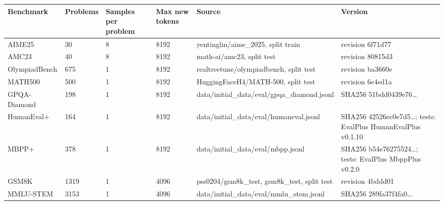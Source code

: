 \begin{tabular}{llllll}
\toprule
Benchmark & Problems & Samples per problem & Max new tokens & Source & Version \\
\midrule
AIME25 & 30 & 8 & 8192 & yentinglin/aime\_2025, split train & revision 6f71d77 \\
AMC23 & 40 & 8 & 8192 & math-ai/amc23, split test & revision 80815d3 \\
OlympiadBench & 675 & 1 & 8192 & realtreetune/olympiadbench, split test & revision ba3660e \\
MATH500 & 500 & 1 & 8192 & HuggingFaceH4/MATH-500, split test & revision 6e4ed1a \\
GPQA-Diamond & 198 & 1 & 8192 & data/initial\_data/eval/gpqa\_diamond.jsonl & SHA256 51bdd0439e76… \\
HumanEval+ & 164 & 1 & 8192 & data/initial\_data/eval/humaneval.jsonl & SHA256 42526ec0e7d5…; tests: EvalPlus HumanEvalPlus v0.1.10 \\
MBPP+ & 378 & 1 & 8192 & data/initial\_data/eval/mbpp.jsonl & SHA256 b54e76275524…; tests: EvalPlus MbppPlus v0.2.0 \\
GSM8K & 1319 & 1 & 4096 & pss0204/gsm8k\_test, gsm8k\_test, split test & revision 4bddd01 \\
MMLU-STEM & 3153 & 1 & 4096 & data/initial\_data/eval/mmlu\_stem.jsonl & SHA256 289fa37f4fa0… \\
\bottomrule
\end{tabular}
